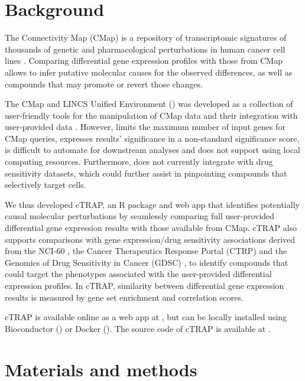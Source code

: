 \section{Background}

The Connectivity Map (CMap) is a repository of transcriptomic signatures of thousands of genetic and pharmacological perturbations in human cancer cell lines \cite{subramanian:2017ul}. Comparing differential gene expression profiles with those from CMap allows to infer putative molecular causes for the observed differences, as well as compounds that may promote or revert those changes.

The CMap and LINCS Unified Environment () was developed as a collection of user-friendly tools for the manipulation of CMap data and their integration with user-provided data \cite{subramanian:2017ul}. However,  limits the maximum number of input genes for CMap queries, expresses results' significance in a non-standard significance score, is difficult to automate for downstream analyses and does not support using local computing resources. Furthermore,  does not currently integrate with drug sensitivity datasets, which could further assist in pinpointing compounds that selectively target cells.

We thus developed cTRAP, an R package and web app that identifies potentially causal molecular perturbations by seamlessly comparing full user-provided differential gene expression results with those available from CMap. cTRAP also supports comparisons with gene expression/drug sensitivity associations derived from the NCI-60 \cite{shoemaker:2006wi}, the Cancer Therapeutics Response Portal (CTRP) \cite{seashore-ludlow:2015ws} and the Genomics of Drug Sensitivity in Cancer (GDSC) \cite{yang:2012vk}, to identify compounds that could target the phenotypes associated with the user-provided differential expression profiles. In cTRAP, similarity between differential gene expression results is measured by gene set enrichment \cite{subramanian:2017ul,subramanian:2005wu} and correlation scores.

cTRAP is available online as a web app at , but can be locally installed using Bioconductor () or Docker (). The source code of cTRAP is available at .

\section{Materials and methods}

